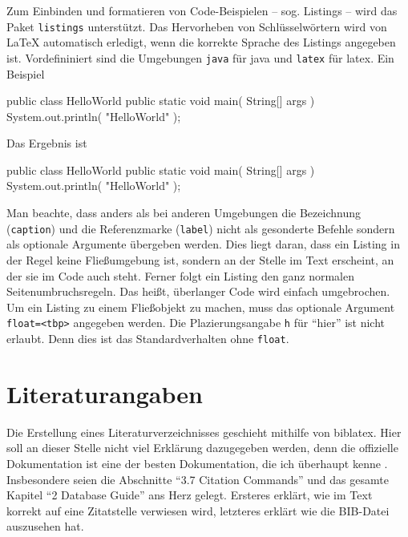 Zum Einbinden und formatieren von Code-Beispielen --
sog. Listings -- wird das Paket \texttt{listings}
\parencite{Hoffmann2014} unterstützt. Das Hervorheben von
Schlüsselwörtern wird von LaTeX automatisch
erledigt, wenn die korrekte Sprache des Listings angegeben ist. Vordefininiert
sind die Umgebungen \texttt{java} für \gls{java} und \texttt{latex} für \gls{latex}.
Ein Beispiel
\begin{latex}[%
  caption={Listing-Beispiel},%
  label={lst:listing}]
\begin{java}[caption={A Java Hello-World example},label={lst:hello-world}]
public class HelloWorld {
  public static void main( String[] args ) {
    System.out.println( "HelloWorld" );
  }
}
\end{java}
\end{latex}
Das Ergebnis ist
\begin{java}[caption={A Java Hello-World example},label={lst:hello-world}]
public class HelloWorld {
  public static void main( String[] args ) {
    System.out.println( "HelloWorld" );
  }
}
\end{java}
Man beachte, dass anders als bei anderen Umgebungen die Bezeichnung
(\texttt{caption}) und die Referenzmarke (\texttt{label}) nicht als gesonderte
Befehle sondern als optionale Argumente übergeben werden. Dies liegt daran,
dass ein Listing in der Regel keine Fließumgebung ist, sondern an der Stelle
im Text erscheint, an der sie im Code auch steht. Ferner folgt ein Listing den
ganz normalen Seitenumbruchsregeln. Das heißt, überlanger Code wird einfach
umgebrochen. Um ein Listing zu einem Fließobjekt zu machen, muss das optionale
Argument \texttt{float=<tbp>} angegeben werden. Die
Plazierungsangabe \texttt{h} für \enquote{hier} ist nicht
erlaubt. Denn dies ist das Standardverhalten ohne \texttt{float}.


\section{Literaturangaben}

Die Erstellung eines Literaturverzeichnisses geschieht mithilfe von \gls{biblatex}.
Hier soll an dieser Stelle nicht viel Erklärung dazugegeben werden, denn die
offizielle Dokumentation ist eine der besten Dokumentation, die ich überhaupt
kenne \parencite{Lehman2013}. Insbesondere seien die Abschnitte \enquote{3.7
Citation Commands} und das gesamte Kapitel \enquote{2 Database Guide} ans Herz
gelegt. Ersteres erklärt, wie im Text korrekt auf eine Zitatstelle verwiesen
wird, letzteres erklärt wie die BIB-Datei auszusehen hat.

